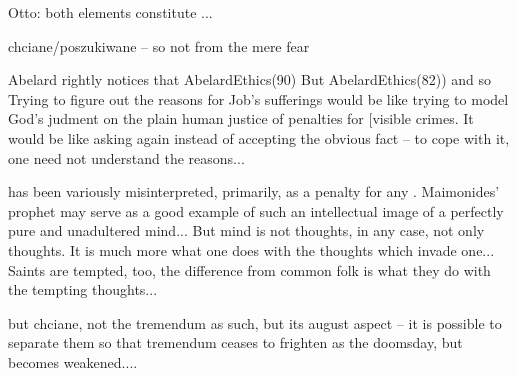       Otto: both elements constitute ...
      
chciane/poszukiwane -- so not from the mere fear

Abelard rightly notices that \citet{God pays attention only to the mind in
  rewarding good and evil, not to the results of the deeds.}{AbelardEthics}{(90)} But
  \citet{human beings do not judge about what is hidden but about what is
  plain}{AbelardEthics}{(82)) and so  Trying to figure out the reasons for Job's
  sufferings would be like trying to model God's judment on the plain human
  justice of  penalties for \co[visible} crimes. It would be like
  asking again  instead of accepting the obvious fact  -- to
  cope with it, one need not understand the reasons...

 has been variously misinterpreted,
primarily, as a penalty for any . Maimonides' prophet may
serve as a good example of such an intellectual image of a perfectly pure and
unadultered mind... But mind is not thoughts, in any case, not only thoughts. It
is much more what one does with the thoughts which invade one... Saints are
tempted, too, the difference from common folk is what they do with the tempting
thoughts... 

but chciane, not the tremendum as such, but its august aspect -- it is possible
to separate them so that tremendum ceases to frighten as the doomsday, but
becomes weakened....



